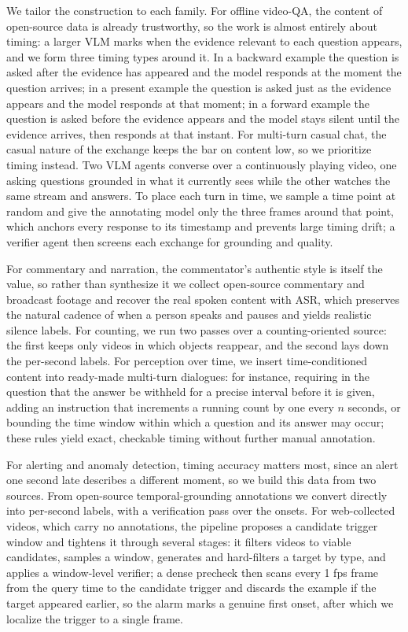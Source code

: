 We tailor the construction to each family. For offline video-QA, the content of open-source data is already trustworthy, so the work is almost entirely about timing: a larger VLM marks when the evidence relevant to each question appears, and we form three timing types around it. In a backward example the question is asked after the evidence has appeared and the model responds at the moment the question arrives; in a present example the question is asked just as the evidence appears and the model responds at that moment; in a forward example the question is asked before the evidence appears and the model stays silent until the evidence arrives, then responds at that instant. For multi-turn casual chat, the casual nature of the exchange keeps the bar on content low, so we prioritize timing instead. Two VLM agents converse over a continuously playing video, one asking questions grounded in what it currently sees while the other watches the same stream and answers. To place each turn in time, we sample a time point at random and give the annotating model only the three frames around that point, which anchors every response to its timestamp and prevents large timing drift; a verifier agent then screens each exchange for grounding and quality. 

For commentary and narration, the commentator's authentic style is itself the value, so rather than synthesize it we collect open-source commentary and broadcast footage and recover the real spoken content with ASR, which preserves the natural cadence of when a person speaks and pauses and yields realistic silence labels. For counting, we run two passes over a counting-oriented source: the first keeps only videos in which objects reappear, and the second lays down the per-second labels. For perception over time, we insert time-conditioned content into ready-made multi-turn dialogues: for instance, requiring in the question that the answer be withheld for a precise interval before it is given, adding an instruction that increments a running count by one every $n$ seconds, or bounding the time window within which a question and its answer may occur; these rules yield exact, checkable timing without further manual annotation. 

 For alerting and anomaly detection, timing accuracy matters most, since an alert one second late describes a different moment, so we build this data from two sources. From open-source temporal-grounding annotations we convert directly into per-second labels, with a verification pass over the onsets. For web-collected videos, which carry no annotations, the pipeline proposes a candidate trigger window and tightens it through several stages: it filters videos to viable candidates, samples a window, generates and hard-filters a target by type, and applies a window-level verifier; a dense precheck then scans every 1 fps frame from the query time to the candidate trigger and discards the example if the target appeared earlier, so the alarm marks a genuine first onset, after which we localize the trigger to a single frame.


